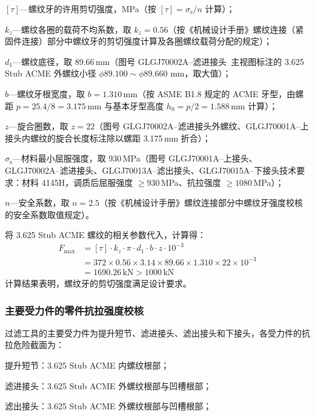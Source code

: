 $[\tau]$---螺纹牙的许用剪切强度，MPa（按 $[\tau]=\sigma_{\mathrm{s}}/n$ 计算）；

$k_z$---螺纹各圈的载荷不均系数，取 $k_z = 0.56$（按《机械设计手册》螺纹连接（紧固件连接）部分中螺纹牙的剪切强度计算及各圈螺纹载荷分配的规定\cite{ref26}）；

$d_1$---螺纹底径，取 89.66\,mm（图号 GLGJ70002A--滤进接头\ 主视图标注的 3.625 Stub ACME 外螺纹小径 $\phi 89.100\sim \phi 89.660$ mm，取大值）；

$b$---螺纹牙根宽度，取 $b = 1.310\,\text{mm}$（按 ASME B1.8 规定的 ACME 牙型，由螺距 $p=25.4/8=3.175\,\text{mm}$ 与基本牙型高度 $h_0=p/2=1.588\,\text{mm}$ 计算）；

$z$---旋合圈数，取 $z = 22$（图号 GLGJ70002A--滤进接头外螺纹、GLGJ70001A--上接头内螺纹的旋合长度标注除以螺距 3.175\,mm 折合）；

$\sigma_{\mathrm{s}}$---材料最小屈服强度，取 930\,MPa（图号 GLGJ70001A--上接头、GLGJ70002A--滤进接头、GLGJ70013A--滤出接头、GLGJ70015A--下接头技术要求：材料 4145H，调质后屈服强度 $\ge 930$\,MPa、抗拉强度 $\ge 1080$\,MPa）；

$n$---安全系数，取 $n = 2.5$（按《机械设计手册》螺纹连接部分中螺纹牙强度校核的安全系数取值规定\cite{ref26}）。

将 3.625 Stub ACME 螺纹的相关参数代入，计算得：
\begin{equation}
    \begin{aligned}
        F_{\max} &= [\tau] \cdot k_z \cdot \pi \cdot d_1 \cdot b \cdot z \cdot 10^{-3} \\
                &= 372 \times 0.56 \times 3.14 \times 89.66 \times 1.310 \times 22 \times 10^{-3} \\
                &= 1690.26\,\text{kN} > 1000\,\text{kN}
    \end{aligned}
\end{equation}
计算结果表明，螺纹牙的剪切强度满足设计要求。


\subsubsection{主要受力件的零件抗拉强度校核}

过滤工具的主要受力件为提升短节、滤进接头、滤出接头和下接头，各受力件的抗拉危险截面为：

提升短节：3.625 Stub ACME 内螺纹根部；

滤进接头：3.625 Stub ACME 外螺纹根部与凹槽根部；

滤出接头：3.625 Stub ACME 外螺纹根部与凹槽根部；

